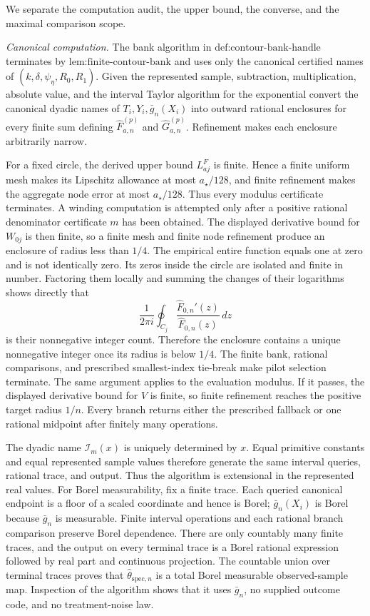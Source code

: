 We separate the computation audit, the upper bound, the converse, and the maximal comparison scope.

\emph{Canonical computation.}  The bank algorithm in \(\text{def:contour-bank-handle}\) terminates by \(\text{lem:finite-contour-bank}\) and uses only the canonical certified names of \((k,\delta,\psi_{\eta},R_0,R_1)\).  Given the represented sample, subtraction, multiplication, absolute value, and the interval Taylor algorithm for the exponential convert the canonical dyadic names of \(T_i,Y_i,\bar g_n(X_i)\) into outward rational enclosures for every finite sum defining \(\widehat F_{a,n}^{(p)}\) and \(\widehat G_{a,n}^{(p)}\).  Refinement makes each enclosure arbitrarily narrow.

For a fixed circle, the derived upper bound \(L^F_{aj}\) is finite.  Hence a finite uniform mesh makes its Lipschitz allowance at most \(a_{\star}/128\), and finite refinement makes the aggregate node error at most \(a_{\star}/128\).  Thus every modulus certificate terminates.  A winding computation is attempted only after a positive rational denominator certificate \(m\) has been obtained.  The displayed derivative bound for \(W_{0j}\) is then finite, so a finite mesh and finite node refinement produce an enclosure of radius less than \(1/4\).  The empirical entire function equals one at zero and is not identically zero.  Its zeros inside the circle are isolated and finite in number.  Factoring them locally and summing the changes of their logarithms shows directly that
\[
 \frac1{2\pi i}\oint_{C_j}
 \frac{\widehat F_{0,n}'(z)}{\widehat F_{0,n}(z)}\,dz
\]
is their nonnegative integer count.  Therefore the enclosure contains a unique nonnegative integer once its radius is below \(1/4\).  The finite bank, rational comparisons, and prescribed smallest-index tie-break make pilot selection terminate.  The same argument applies to the evaluation modulus.  If it passes, the displayed derivative bound for \(V\) is finite, so finite refinement reaches the positive target radius \(1/n\).  Every branch returns either the prescribed fallback or one rational midpoint after finitely many operations.

The dyadic name \(\mathcal I_m(x)\) is uniquely determined by \(x\).  Equal primitive constants and equal represented sample values therefore generate the same interval queries, rational trace, and output.  Thus the algorithm is extensional in the represented real values.  For Borel measurability, fix a finite trace.  Each queried canonical endpoint is a floor of a scaled coordinate and hence is Borel; \(\bar g_n(X_i)\) is Borel because \(\bar g_n\) is measurable.  Finite interval operations and each rational branch comparison preserve Borel dependence.  There are only countably many finite traces, and the output on every terminal trace is a Borel rational expression followed by real part and continuous projection.  The countable union over terminal traces proves that \(\widehat\theta_{\mathrm{spec},n}\) is a total Borel measurable observed-sample map.  Inspection of the algorithm shows that it uses \(\bar g_n\), no supplied outcome code, and no treatment-noise law.

